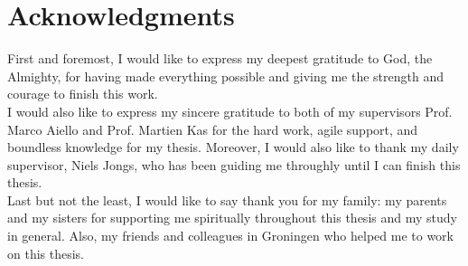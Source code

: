 
\begingroup
\let\clearpage\relax
\let\cleardoublepage\relax
\let\cleardoublepage\relax
\chapter*{Acknowledgments}
First and foremost, I would like to express my deepest gratitude to God, the Almighty, for having made everything possible and giving me the strength and courage to finish this work.\\

\noindent
I would also like to express my sincere gratitude to both of my supervisors Prof. Marco Aiello and Prof. Martien Kas for the hard work, agile support, and boundless knowledge for my thesis. Moreover, I would also like to thank my daily supervisor, Niels Jongs, who has been guiding me throughly until I can finish this thesis.\\

\noindent
Last but not the least, I would like to say thank you for my family: my parents and my sisters for supporting me spiritually throughout this thesis and my study in general. Also, my friends and colleagues in Groningen who helped me to work on this thesis.
\endgroup

